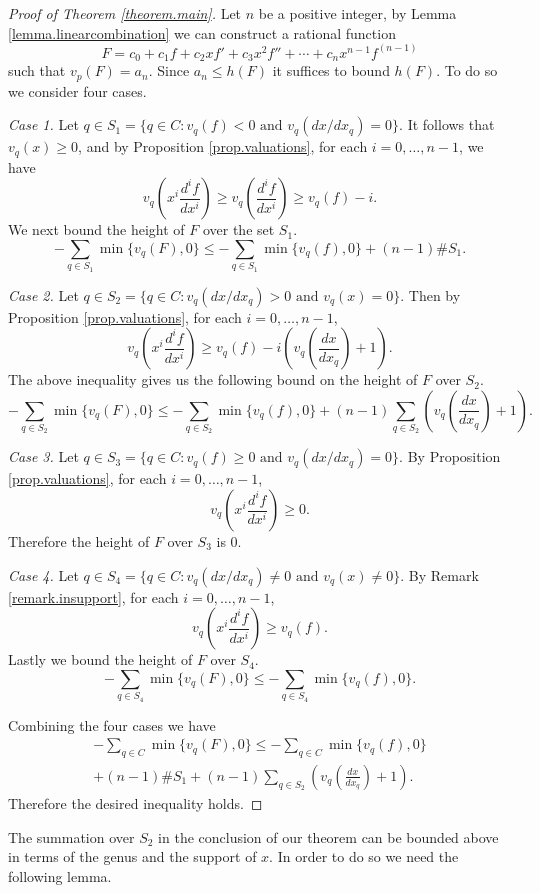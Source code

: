 \documentclass{amsart}
\theoremstyle{definition}
\theoremstyle{remark}
\numberwithin{equation}{section}
\begin{document}
\begin{proof}[Proof of Theorem \ref{theorem.main}]
Let $n$ be a positive integer, by Lemma \ref{lemma.linearcombination} we can construct a rational function
\[
F = c_0 + c_1 f + c_2 x f' + c_3 x^2 f''+ \cdots + c_n x^{n-1} f^{(n-1)}
\]
such that $v_p(F) = a_n$. Since $a_n \leq h(F)$ it suffices to bound $h(F)$. To do so we consider four cases.

\emph{Case 1.} Let $q\in S_1 = \{q\in C : v_q(f) < 0 \text{ and } v_q(dx/dx_q) = 0\}$. It follows that $v_q(x) \geq 0$, and by Proposition \ref{prop.valuations}, for each $i=0,\ldots, n-1$, we have
\[
v_q\left(x^i\frac{d^if}{dx^i}\right) \geq v_q\left(\frac{d^if}{dx^i}\right) \geq v_q(f)-i.
\]
We next bound the height of $F$ over the set $S_1$.
\[
-\sum_{q\in S_1} \min\{v_q(F), 0\} \leq -\sum_{q\in S_1} \min\{v_q(f), 0\} + (n-1)\#S_1.
\]

\emph{Case 2.} Let $q\in S_2 = \{q \in C : v_q(dx/dx_q) > 0 \text{ and } v_q(x) = 0\}$. Then by Proposition \ref{prop.valuations}, for each $i=0,\ldots, n-1$,
\[
v_q\left(x^i\frac{d^if}{dx^i}\right) \geq v_q(f)-i\left(v_q\left(\frac{dx}{dx_q}\right)+1\right).
\]
The above inequality gives us the following bound on the height of $F$ over $S_2$.
\[
-\sum_{q\in S_2} \min\{v_q(F), 0\} \leq -\sum_{q\in S_2} \min\{v_q(f), 0\} + (n-1)\sum_{q\in S_2}\left(v_q\left(\frac{dx}{dx_q}\right)+1\right).
\]

\emph{Case 3.} Let $q\in S_3 = \{q\in C : v_q(f) \geq 0 \text{ and } v_q(dx/dx_q) = 0\}$. By Proposition \ref{prop.valuations}, for each $i=0,\ldots, n-1$,
\[
v_q\left(x^i\frac{d^if}{dx^i}\right) \geq 0.
\]
Therefore the height of $F$ over $S_3$ is $0$.

\emph{Case 4.} Let $q\in S_4 = \{q\in C : v_q(dx/dx_q) \neq 0 \text{ and } v_q(x) \neq 0\}$. By Remark \ref{remark.insupport}, for each $i=0, \ldots, n-1$,
\[
v_q\left(x^i\frac{d^if}{dx^i}\right) \geq v_q(f).
\]
Lastly we bound the height of $F$ over $S_4$.
\[
-\sum_{q\in S_4} \min\{v_q(F), 0\} \leq -\sum_{q\in S_4} \min\{v_q(f), 0\}.
\]

Combining the four cases we have
\begin{multline*}
-\sum_{q\in C}\min\{v_q(F), 0\} \leq -\sum_{q\in C} \min\{v_q(f), 0 \}\\
+(n-1)\#S_1+(n-1)\sum_{q\in S_2} \left(v_q\left(\frac{dx}{dx_q}\right)+1\right).
\end{multline*}
Therefore the desired inequality holds.
\end{proof}

The summation over $S_2$ in the conclusion of our theorem can be bounded above in terms of the genus and the support of $x$. In order to do so we need the following lemma.
\end{document}
